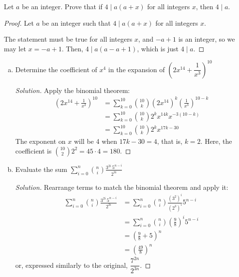 \documentclass{agony}
\begin{document}
\question Let $a$ be an integer. Prove that if $4 \mid a(a+x)$ for all integers $x$, then $4 \mid a$.
\begin{proof}
  Let $a$ be an integer such that $4 \mid a(a+x)$ for all integers $x$.

  The statement must be true for all integers $x$, and $-a+1$ is an integer, so we may let $x=-a+1$.
  Then, $4 \mid a(a-a+1)$, which is just $4 \mid a$.
\end{proof}


\question \begin{enumerate}[(a)]
  \item Determine the coefficient of $x^4$ in the expansion of $\left(2x^{14} + \dfrac{1}{x^3}\right)^{10}$
        \begin{proof}[Solution]
          Apply the binomial theorem:
          \begin{align*}
            \left(2x^{14} + \frac{1}{x^3}\right)^{10}
             & = \sum_{k=0}^{10} \binom{10}{k} (2x^{14})^k \left(\frac{1}{x^3}\right)^{10-k} \\
             & = \sum_{k=0}^{10} \binom{10}{k} 2^k x^{14k} x^{-3(10-k)}                      \\
             & = \sum_{k=0}^{10} \binom{10}{k} 2^k x^{17k-30}
          \end{align*}
          The exponent on $x$ will be 4 when $17k-30=4$, that is, $k=2$.
          Here, the coefficient is $\binom{10}{2}2^2 = 45 \cdot 4 = 180$.
        \end{proof}
  \item Evaluate the sum $\displaystyle\sum_{i=0}^n\binom{n}{i}\frac{3^{2i}\,5^{n-i}}{2^{3i}}$
        \begin{proof}[Solution]
          Rearrange terms to match the binomial theorem and apply it:
          \begin{align*}
            \sum_{i=0}^n\binom{n}{i}\frac{3^{2i}\,5^{n-i}}{2^{3i}}
             & = \sum_{i=0}^n\binom{n}{i} \frac{(3^2)^i}{(2^3)^i} 5^{n-i}    \\
             & = \sum_{i=0}^n\binom{n}{i} \left(\frac{9}{8}\right)^i 5^{n-i} \\
             & = \left( \frac{9}{8} + 5 \right)^{n}                          \\
             & = \left( \frac{49}{8} \right)^{n}
          \end{align*}
          or, expressed similarly to the original, $\dfrac{7^{2n}}{2^{3n}}$.
        \end{proof}
\end{enumerate}
\end{document}
